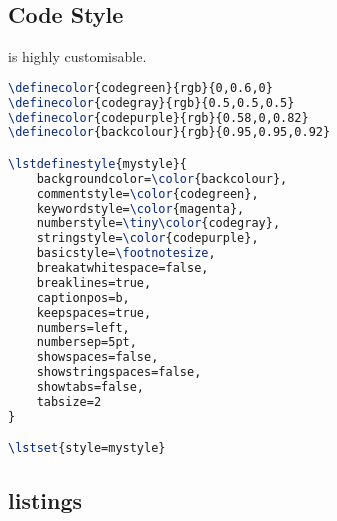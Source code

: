 \subsection{Code Style}
 is highly customisable.  
\begin{lstlisting}[language=TeX]
\definecolor{codegreen}{rgb}{0,0.6,0}
\definecolor{codegray}{rgb}{0.5,0.5,0.5}
\definecolor{codepurple}{rgb}{0.58,0,0.82}
\definecolor{backcolour}{rgb}{0.95,0.95,0.92}

\lstdefinestyle{mystyle}{
    backgroundcolor=\color{backcolour},   
    commentstyle=\color{codegreen},
    keywordstyle=\color{magenta},
    numberstyle=\tiny\color{codegray},
    stringstyle=\color{codepurple},
    basicstyle=\footnotesize,
    breakatwhitespace=false,         
    breaklines=true,                 
    captionpos=b,                    
    keepspaces=true,                 
    numbers=left,                    
    numbersep=5pt,                  
    showspaces=false,                
    showstringspaces=false,
    showtabs=false,                  
    tabsize=2
}

\lstset{style=mystyle}
\end{lstlisting}

\subsection{listings}

